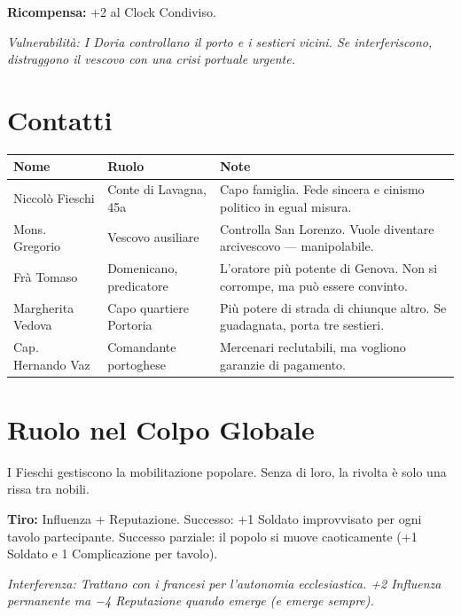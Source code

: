 \textbf{Ricompensa:} +2 al Clock Condiviso.

\textit{Vulnerabilità: I Doria controllano il porto e i sestieri vicini.
Se interferiscono, distraggono il vescovo con una crisi portuale urgente.}

\section{Contatti}


\begin{center}
\begin{tabularx}{\textwidth}{L{2.8cm} L{2.8cm} X}
  \toprule
  \textbf{Nome} & \textbf{Ruolo} & \textbf{Note} \\
  \midrule
  Niccolò Fieschi   & Conte di Lavagna, 45a   & Capo famiglia. Fede sincera e cinismo politico in egual misura. \\
  Mons. Gregorio    & Vescovo ausiliare       & Controlla San Lorenzo. Vuole diventare arcivescovo — manipolabile. \\
  Frà Tomaso        & Domenicano, predicatore & L'oratore più potente di Genova. Non si corrompe, ma può essere convinto. \\
  Margherita Vedova & Capo quartiere Portoria & Più potere di strada di chiunque altro. Se guadagnata, porta tre sestieri. \\
  Cap. Hernando Vaz & Comandante portoghese   & Mercenari reclutabili, ma vogliono garanzie di pagamento. \\
  \bottomrule
\end{tabularx}
\end{center}

\section{Ruolo nel Colpo Globale}

I Fieschi gestiscono la mobilitazione popolare. Senza di loro, la rivolta
è solo una rissa tra nobili.

\textbf{Tiro:} Influenza + Reputazione. Successo: +1 Soldato improvvisato per
ogni tavolo partecipante. Successo parziale: il popolo si muove caoticamente
(+1 Soldato e 1 Complicazione per tavolo).

\textit{Interferenza: Trattano con i francesi per l'autonomia ecclesiastica.
+2 Influenza permanente ma −4 Reputazione quando emerge (e emerge sempre).}

